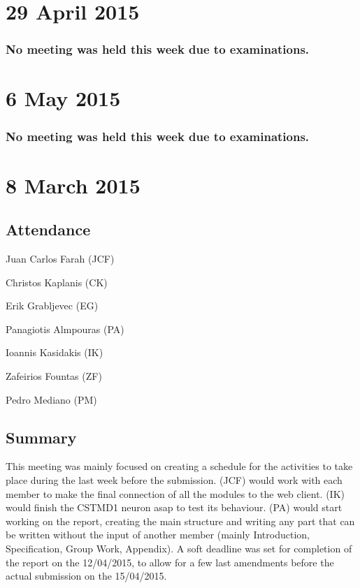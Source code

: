 \documentclass[a4paper,11pt]{article}
\begin{document}
\begin{appendices}
\maketitle
\section*{29 April 2015}
\subsubsection*{No meeting was held this week due to examinations.}

\maketitle
\section*{6 May 2015}
\subsubsection*{No meeting was held this week due to examinations.}

\maketitle
\section*{8 March 2015}
\subsection*{Attendance}
\begin{compactenum}
\item Juan Carlos Farah (JCF)
\item Christos Kaplanis (CK)
\item Erik Grabljevec (EG)
\item Panagiotis Almpouras (PA)
\item Ioannis Kasidakis (IK)
\item Zafeirios Fountas (ZF)
\item Pedro Mediano (PM)
\end{compactenum}

\subsection*{Summary}
This meeting was mainly focused on creating a schedule for the activities to take place during the last week before the submission. (JCF) would work with each member to make the final connection of all the modules to the web client. (IK) would finish the CSTMD1 neuron asap to test its behaviour. (PA) would start working on the report, creating the main structure and writing any part that can be written without the input of another member (mainly Introduction,  Specification, Group Work, Appendix). A soft deadline was set for completion of the report on the 12/04/2015, to allow for a few last amendments before the actual submission on the 15/04/2015.


\end{appendices}
\end{document}
